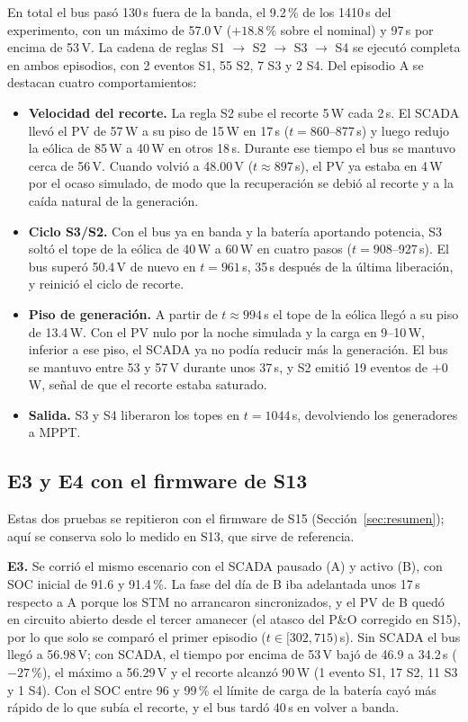 \documentclass[conference]{IEEEtran}
\begin{document}
En total el bus pasó 130\,s fuera de la banda, el 9.2\,\% de los 1410\,s del experimento, con un máximo de 57.0\,V ($+18.8\,\%$ sobre el nominal) y 97\,s por encima de 53\,V. La cadena de reglas S1 $\rightarrow$ S2 $\rightarrow$ S3 $\rightarrow$ S4 se ejecutó completa en ambos episodios, con 2 eventos S1, 55 S2, 7 S3 y 2 S4. Del episodio A se destacan cuatro comportamientos:
\begin{itemize}
\item \textbf{Velocidad del recorte.} La regla S2 sube el recorte 5\,W cada 2\,s. El SCADA llevó el PV de 57\,W a su piso de 15\,W en 17\,s ($t=860$--877\,s) y luego redujo la eólica de 85\,W a 40\,W en otros 18\,s. Durante ese tiempo el bus se mantuvo cerca de 56\,V. Cuando volvió a 48.00\,V ($t\approx897$\,s), el PV ya estaba en 4\,W por el ocaso simulado, de modo que la recuperación se debió al recorte y a la caída natural de la generación.
\item \textbf{Ciclo S3/S2.} Con el bus ya en banda y la batería aportando potencia, S3 soltó el tope de la eólica de 40\,W a 60\,W en cuatro pasos ($t=908$--927\,s). El bus superó 50.4\,V de nuevo en $t=961$\,s, 35\,s después de la última liberación, y reinició el ciclo de recorte.
\item \textbf{Piso de generación.} A partir de $t\approx994$\,s el tope de la eólica llegó a su piso de 13.4\,W. Con el PV nulo por la noche simulada y la carga en 9--10\,W, inferior a ese piso, el SCADA ya no podía reducir más la generación. El bus se mantuvo entre 53 y 57\,V durante unos 37\,s, y S2 emitió 19 eventos de $+0$\,W, señal de que el recorte estaba saturado.
\item \textbf{Salida.} S3 y S4 liberaron los topes en $t=1044$\,s, devolviendo los generadores a MPPT.
\end{itemize}

\subsection{E3 y E4 con el firmware de S13}

Estas dos pruebas se repitieron con el firmware de S15 (Sección~\ref{sec:resumen}); aquí se conserva solo lo medido en S13, que sirve de referencia.

\textbf{E3.} Se corrió el mismo escenario con el SCADA pausado (A) y activo (B), con SOC inicial de 91.6 y 91.4\,\%. La fase del día de B iba adelantada unos 17\,s respecto a A porque los STM no arrancaron sincronizados, y el PV de B quedó en circuito abierto desde el tercer amanecer (el atasco del P\&O corregido en S15), por lo que solo se comparó el primer episodio ($t\in[302,715)$\,s). Sin SCADA el bus llegó a 56.98\,V; con SCADA, el tiempo por encima de 53\,V bajó de 46.9 a 34.2\,s ($-27\,\%$), el máximo a 56.29\,V y el recorte alcanzó 90\,W (1 evento S1, 17 S2, 11 S3 y 1 S4). Con el SOC entre 96 y 99\,\% el límite de carga de la batería cayó más rápido de lo que subía el recorte, y el bus tardó 40\,s en volver a banda.
\end{document}
